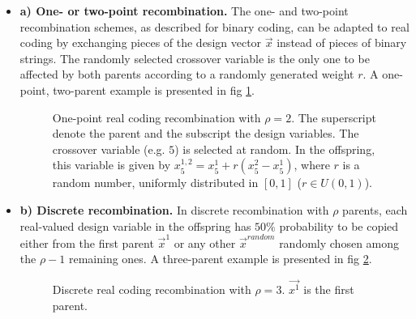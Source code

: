 \begin{itemize}
\FloatBarrier
\item[]{\bf a) One- or two-point recombination.} The one- and two-point recombination schemes, as described for binary coding, can be adapted to real coding by exchanging  pieces of the design vector $\vec{x}$ instead of pieces of binary strings. The randomly selected crossover variable is the only one to be affected by both parents according to a randomly generated weight $r$. A one-point, two-parent example is presented in fig \ref{1pxreal}.

\begin{figure}[h!]
\begin{minipage}[b]{1.0\linewidth}
 \centering
\end{minipage}
\caption{One-point real coding recombination with $\rho=2$. The superscript denote the parent and the subscript the design variables. The crossover variable (e.g. $5$) is selected at random. In the offspring, this variable is given by  $x_5^{1,2}=x_5^{1}+r(x_5^{2}-x_5^{1})$, where $r$ is a random number, uniformly distributed in $[0,1]$ ($r \in U(0,1)$).    
} 
\label{1pxreal}
\end{figure}
 
\FloatBarrier 
\item[]{\bf b) Discrete recombination.} In discrete recombination with $\rho$ parents, each real-valued design variable in the offspring has $50\%$ probability to be copied either from the first parent $\vec{x}^1$ or any other  $\vec{x}^{random}$ randomly chosen among the $\rho-1$ remaining ones. A three-parent example is presented in fig \ref{disc}.

\begin{figure}[h!]
\begin{minipage}[b]{1.0\linewidth}
 \centering
\end{minipage}
\caption{Discrete real coding recombination with $\rho=3$. $\vec{x^1}$ is the first parent.    
} 
\label{disc}
\end{figure}
    

\end{itemize}

